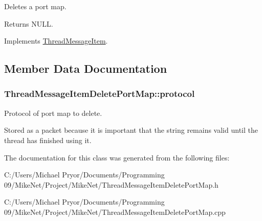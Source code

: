 Deletes a port map. 

\begin{DoxyReturn}{Returns}
NULL. 
\end{DoxyReturn}


Implements \hyperlink{class_thread_message_item_ae09a47834e313524b19700ebc92b0dfe}{ThreadMessageItem}.



\subsection{Member Data Documentation}
\hypertarget{class_thread_message_item_delete_port_map_a6a5d707645152f8b18458766cb43789a}{
\subsubsection[{protocol}]{ {\bf ThreadMessageItemDeletePortMap::protocol}}}
\label{class_thread_message_item_delete_port_map_a6a5d707645152f8b18458766cb43789a}


Protocol of port map to delete. 

Stored as a packet because it is important that the string remains valid until the thread has finished using it. 

The documentation for this class was generated from the following files:\begin{DoxyCompactItemize}
\item 
C:/Users/Michael Pryor/Documents/Programming 09/MikeNet/Project/MikeNet/ThreadMessageItemDeletePortMap.h\item 
C:/Users/Michael Pryor/Documents/Programming 09/MikeNet/Project/MikeNet/ThreadMessageItemDeletePortMap.cpp\end{DoxyCompactItemize}
